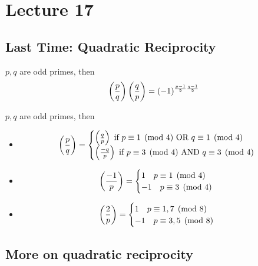 \chapter{Lecture 17}
\date{October 24, 2024}

\section{Last Time: Quadratic Reciprocity}
    \begin{theorem}
        $p,q$ are odd primes, then
        \[
            \left( \frac{p}{q} \right) \left( \frac{q}{p} \right)  = (-1)^{\frac{p-1}{2}\frac{q-1}{2}}
        \]
    \end{theorem}
    \begin{theorem}
        $p,q$ are odd primes, then
        \begin{itemize}
            \item \begin{align*}
                \left( \frac{p}{q} \right)  = 
                \begin{cases}
                    \left( \frac{q}{p} \right)  \text{ if } p\equiv 1\pmod{4} \text{ OR } q\equiv 1\pmod{4} \\
                    \left( \frac{-q}{p} \right)  \text{ if } p\equiv 3\pmod{4} \text{ AND } q\equiv 3\pmod{4}
                \end{cases}
            \end{align*}
            \item \begin{align*}
                \left( \frac{-1}{p} \right)  = 
                \begin{cases}
                    1 \quad p\equiv 1\pmod{4} \\
                    -1 \quad p\equiv 3\pmod{4}
                \end{cases}
            \end{align*}
            \item \begin{align*}
                \left( \frac{2}{p} \right)  = 
                \begin{cases}
                    1 \quad p\equiv 1,7\pmod{8} \\
                    -1 \quad p\equiv 3,5\pmod{8}
                \end{cases}
            \end{align*}
        \end{itemize}
    \end{theorem}

\section{More on quadratic reciprocity}
